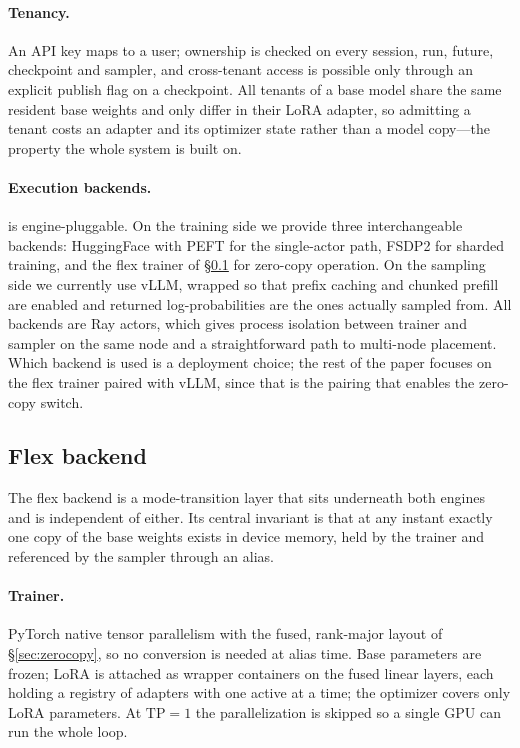 \paragraph{Tenancy.} An API key maps to a user; ownership is checked on every session,
run, future, checkpoint and sampler, and cross-tenant access is possible only through
an explicit publish flag on a checkpoint. All tenants of a base model share the same
resident base weights and only differ in their LoRA adapter, so admitting a tenant
costs an adapter and its optimizer state rather than a model copy---the property the
whole system is built on.

\paragraph{Execution backends.} \sysname is engine-pluggable. On the training side we
provide three interchangeable backends: HuggingFace with PEFT for the single-actor
path, FSDP2 for sharded training, and the flex trainer of \S\ref{sec:impl:flex} for
zero-copy operation. On the sampling side we currently use vLLM, wrapped so that
prefix caching and chunked prefill are enabled and returned log-probabilities are the
ones actually sampled from. All backends are Ray actors, which gives process isolation
between trainer and sampler on the same node and a straightforward path to multi-node
placement. Which backend is used is a deployment choice; the rest of the paper focuses
on the flex trainer paired with vLLM, since that is the pairing that enables the
zero-copy switch.

\subsection{Flex backend}
\label{sec:impl:flex}

The flex backend is a mode-transition layer that sits underneath both engines and is
independent of either. Its central invariant is that at any instant exactly one copy of
the base weights exists in device memory, held by the trainer and referenced by the
sampler through an alias.

\paragraph{Trainer.} PyTorch native tensor parallelism with the fused, rank-major
layout of \S\ref{sec:zerocopy}, so no conversion is needed at alias time. Base
parameters are frozen; LoRA is attached as wrapper containers on the fused linear
layers, each holding a registry of adapters with one active at a time; the optimizer
covers only LoRA parameters. At $\text{TP}=1$ the parallelization is skipped so a single
GPU can run the whole loop.


